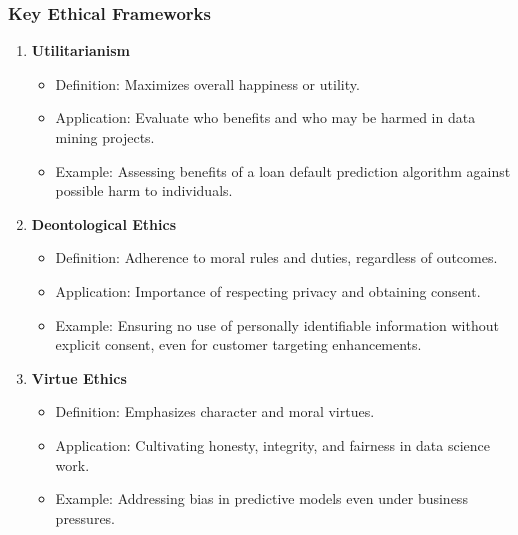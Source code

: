 \documentclass[aspectratio=169]{beamer}
\begin{document}
\begin{frame}[fragile]
    \frametitle{Key Ethical Frameworks}
    
    \begin{enumerate}
        \item \textbf{Utilitarianism}
        \begin{itemize}
            \item Definition: Maximizes overall happiness or utility.
            \item Application: Evaluate who benefits and who may be harmed in data mining projects.
            \item Example: Assessing benefits of a loan default prediction algorithm against possible harm to individuals.
        \end{itemize}

        \item \textbf{Deontological Ethics}
        \begin{itemize}
            \item Definition: Adherence to moral rules and duties, regardless of outcomes.
            \item Application: Importance of respecting privacy and obtaining consent.
            \item Example: Ensuring no use of personally identifiable information without explicit consent, even for customer targeting enhancements.
        \end{itemize}

        \item \textbf{Virtue Ethics}
        \begin{itemize}
            \item Definition: Emphasizes character and moral virtues.
            \item Application: Cultivating honesty, integrity, and fairness in data science work.
            \item Example: Addressing bias in predictive models even under business pressures.
        \end{itemize}
    \end{enumerate}
\end{frame}
\end{document}

